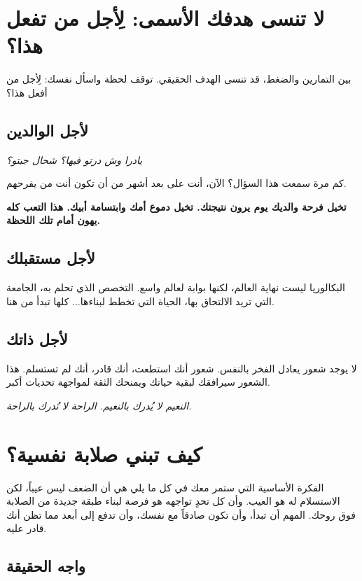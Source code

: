 \documentclass[12pt,a4paper]{book}
\newcommand{\quoteAr}[1]{%
	\begin{myquote}
		\itshape #1
	\end{myquote}
}
\newcommand{\importantAr}[1]{%
	\begin{important}
		\bfseries #1
	\end{important}
}
\begin{document}
	
	\section{لا تنسى هدفك الأسمى: لِأجل من تفعل هذا؟}
	
	بين التمارين والضغط، قد تنسى الهدف الحقيقي. توقف لحظة واسأل نفسك: لِأجل من أفعل هذا؟
	
	\subsection{لأجل الوالدين}
	\quoteAr{يادرا وش درتو فيها؟ شحال جبتو؟}
	
	كم مرة سمعت هذا السؤال؟ الآن، أنت على بعد أشهر من أن تكون أنت من يفرحهم.
	\vspace{2.5cm}
	\importantAr{تخيل فرحة والديك يوم يرون نتيجتك. تخيل دموع أمك وابتسامة أبيك. هذا التعب كله يهون أمام تلك اللحظة.}
	
	\subsection{لأجل مستقبلك}
	البكالوريا ليست نهاية العالم، لكنها بوابة لعالم واسع. التخصص الذي تحلم به، الجامعة التي تريد الالتحاق بها، الحياة التي تخطط لبناءها... كلها تبدأ من هنا.
	
	\subsection{لأجل ذاتك}
	لا يوجد شعور يعادل الفخر بالنفس. شعور أنك استطعت، أنك قادر، أنك لم تستسلم. هذا الشعور سيرافقك لبقية حياتك ويمنحك الثقة لمواجهة تحديات أكبر.
	
	\quoteAr{النعيم لا يُدرك بالنعيم. الراحة لا تُدرك بالراحة.}
	
	\section{كيف تبني صلابة نفسية؟}
	\label{sec:build-unbreakable-mind}
	
	الفكرة الأساسية التي ستمر معك في كل ما يلي هي أن الضعف ليس عيباً، لكن الاستسلام له هو العيب. وأن كل تحدٍ تواجهه هو فرصة لبناء طبقة جديدة من الصلابة فوق روحك. المهم أن تبدأ، وأن تكون صادقاً مع نفسك، وأن تدفع إلى أبعد مما تظن أنك قادر عليه.
	
	\subsection{واجه الحقيقة}
	\label{subsec:accountability-mirror}
	
\end{document}
